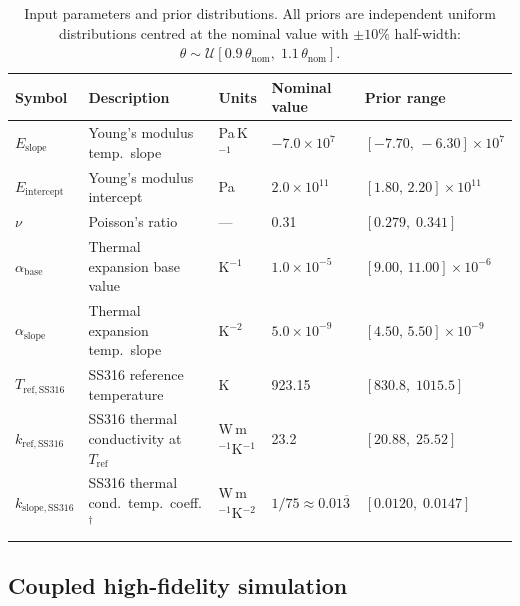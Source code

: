 \documentclass[pdflatex,sn-mathphys-num]{sn-jnl}
\theoremstyle{thmstyleone}
\theoremstyle{thmstyletwo}
\theoremstyle{thmstylethree}
\begin{document}
\begin{table}[ht]
\caption{Input parameters and prior distributions. All priors are independent uniform
  distributions centred at the nominal value with $\pm10\%$ half-width:
  $\theta \sim \mathcal{U}[0.9\,\theta_{\mathrm{nom}},\;1.1\,\theta_{\mathrm{nom}}]$.}
\label{tab:inputs}
\begin{tabular*}{\textwidth}{@{\extracolsep\fill}lllll@{}}
\toprule
Symbol & Description & Units & Nominal value & Prior range \\
\midrule
$E_{\mathrm{slope}}$
  & Young's modulus temp.\ slope
  & Pa\,K$^{-1}$
  & $-7.0\times10^{7}$
  & $[-7.70,\,-6.30]\times10^{7}$ \\
$E_{\mathrm{intercept}}$
  & Young's modulus intercept
  & Pa
  & $2.0\times10^{11}$
  & $[1.80,\,2.20]\times10^{11}$ \\
$\nu$
  & Poisson's ratio
  & ---
  & 0.31
  & $[0.279,\;0.341]$ \\
$\alpha_{\mathrm{base}}$
  & Thermal expansion base value
  & K$^{-1}$
  & $1.0\times10^{-5}$
  & $[9.00,\,11.00]\times10^{-6}$ \\
$\alpha_{\mathrm{slope}}$
  & Thermal expansion temp.\ slope
  & K$^{-2}$
  & $5.0\times10^{-9}$
  & $[4.50,\,5.50]\times10^{-9}$ \\
$T_{\mathrm{ref,SS316}}$
  & SS316 reference temperature
  & K
  & 923.15
  & $[830.8,\;1015.5]$ \\
$k_{\mathrm{ref,SS316}}$
  & SS316 thermal conductivity at $T_{\mathrm{ref}}$
  & W\,m$^{-1}$K$^{-1}$
  & 23.2
  & $[20.88,\;25.52]$ \\
$k_{\mathrm{slope,SS316}}$
  & SS316 thermal cond.\ temp.\ coeff.$^\dagger$
  & W\,m$^{-1}$K$^{-2}$
  & $1/75 \approx 0.01\overline{3}$
  & $[0.0120,\;0.0147]$ \\
\botrule
\end{tabular*}
\end{table}

\subsection{Coupled high-fidelity simulation}\label{sec:hf}
\end{document}
